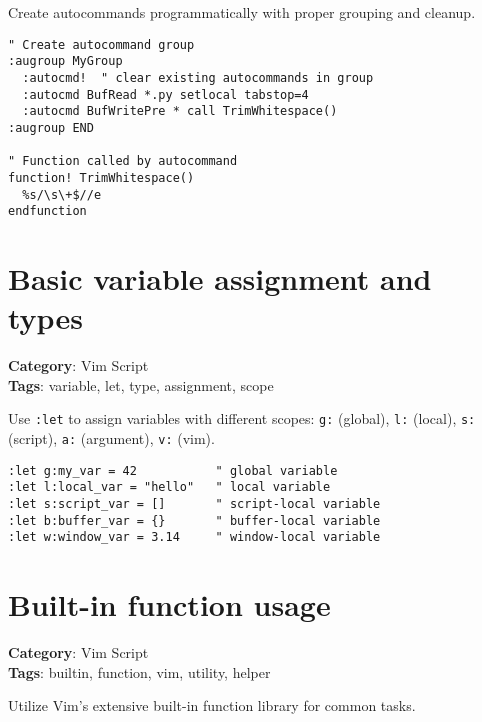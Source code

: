 {{{{{{{{{{{{{{{{{{{Create autocommands programmatically with proper grouping and cleanup.

\begin{Exa*}{}
\begin{Verbatim}[fontsize=\footnotesize, breaklines, breakanywhere]
" Create autocommand group
:augroup MyGroup
  :autocmd!  " clear existing autocommands in group
  :autocmd BufRead *.py setlocal tabstop=4
  :autocmd BufWritePre * call TrimWhitespace()
:augroup END

" Function called by autocommand
function! TrimWhitespace()
  %s/\s\+$//e
endfunction
\end{Verbatim}
\end{Exa*}

\section{Basic variable assignment and types}

\textbf{Category}: Vim Script\\ \textbf{Tags}: variable, let, type, assignment, scope
\vspace{0.5cm}

Use {\footnotesize \Verb§:let§} to assign variables with different scopes: {\footnotesize \Verb§g:§} (global), {\footnotesize \Verb§l:§} (local), {\footnotesize \Verb§s:§} (script), {\footnotesize \Verb§a:§} (argument), {\footnotesize \Verb§v:§} (vim).

\begin{Exa*}{}
\begin{Verbatim}[fontsize=\footnotesize, breaklines, breakanywhere]
:let g:my_var = 42           " global variable
:let l:local_var = "hello"   " local variable
:let s:script_var = []       " script-local variable
:let b:buffer_var = {}       " buffer-local variable
:let w:window_var = 3.14     " window-local variable
\end{Verbatim}
\end{Exa*}

\section{Built-in function usage}

\textbf{Category}: Vim Script\\ \textbf{Tags}: builtin, function, vim, utility, helper
\vspace{0.5cm}

Utilize Vim's extensive built-in function library for common tasks.

}}}}}}}}}}}}}}}}}}}
